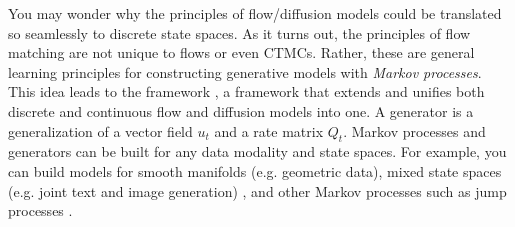 \begin{remarkbox}
You may wonder why the principles of flow/diffusion models could be translated so seamlessly to discrete state spaces. As it turns out, the principles of flow matching are not unique to flows or even CTMCs. Rather, these are general learning principles for constructing generative models with \emph{Markov processes}. This idea leads to the  framework \citep{holderrieth2024generator}, a framework that extends and unifies both discrete and continuous flow and diffusion models into one. A generator is a generalization of a vector field $u_t$ and a rate matrix $Q_t$. Markov processes and generators can be built for any data modality and state spaces. For example, you can build models for smooth manifolds \citep{chen2023flow, de2022riemannian} (e.g. geometric data), mixed state spaces (e.g. joint text and image generation) \citep{campbell2024generative}, and other Markov processes such as jump processes \citep{holderrieth2024generator, campbell2023trans}.
\end{remarkbox}

